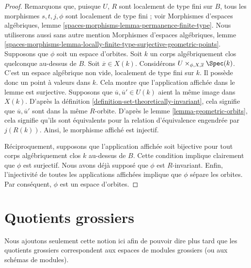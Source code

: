 \begin{proof}
Remarquons que, puisque $U$, $R$ sont localement de type fini sur $B$, tous les
morphismes $s, t, j, \phi$ sont localement de type fini ; voir
Morphismes d'espaces algébriques, lemme \ref{spaces-morphisms-lemma-permanence-finite-type}.
Nous utiliserons aussi sans autre mention
Morphismes d'espaces algébriques, lemme
\ref{spaces-morphisms-lemma-locally-finite-type-surjective-geometric-points}.
Supposons que $\phi$ soit un espace d'orbites. Soit $k$ un corps algébriquement clos
quelconque au-dessus de $B$. Soit $\overline{x} \in X(k)$. Considérons
$U \times_{\phi, X, \overline{x}} \Spec(k)$.
C'est un espace algébrique non vide,
localement de type fini sur $k$. Il possède donc un point à valeurs dans $k$.
Cela montre que l'application affichée dans le lemme est surjective.
Supposons que $\overline{u}, \overline{u}' \in U(k)$ aient la même
image dans $X(k)$. D'après la
définition \ref{definition-set-theoretically-invariant},
cela signifie que $\overline{u}, \overline{u}'$ sont dans la même
$R$-orbite. D'après le lemme \ref{lemma-geometric-orbits}, cela signifie qu'ils
sont équivalents pour la relation d'équivalence engendrée par
$j(R(k))$. Ainsi, le morphisme affiché est injectif.

\medskip\noindent
Réciproquement, supposons que l'application affichée soit bijective pour tout corps
algébriquement clos $k$ au-dessus de $B$. Cette condition implique clairement que $\phi$
est surjectif. Nous avons déjà supposé que $\phi$ est $R$-invariant.
Enfin, l'injectivité de toutes les applications affichées implique que
$\phi$ sépare les orbites. Par conséquent, $\phi$ est un espace d'orbites.
\end{proof}










\section{Quotients grossiers}
\label{section-coarse}

\noindent
Nous ajoutons seulement cette notion ici afin de pouvoir dire plus tard que les quotients
grossiers correspondent aux espaces de modules grossiers (ou aux schémas de modules).

